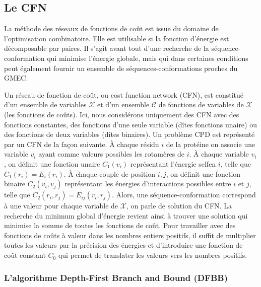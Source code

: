\subsection{Le CFN}

La méthode des réseaux de fonctions de coût est issue du domaine de l'optimisation combinatoire. Elle est utilisable si la fonction d'énergie est décomposable par paires. Il s'agit avant tout d'une recherche de la séquence-conformation qui minimise l'énergie globale, mais qui dans certaines conditions peut également fournir un ensemble de séquences-conformations proches du GMEC.

Un réseau de fonction de coût, ou \og cost function network  \fg (CFN), est constitué d'un ensemble de variables $\mathcal{X}$ et d'un ensemble $\mathcal{C}$ de fonctions de variables de $\mathcal{X}$ (les fonctions de coûts). Ici, nous considérons uniquement des CFN avec des fonctions constantes, des fonctions d'une seule variable (dîtes fonctions unaire) ou des fonctions de deux variables (dîtes binaires). Un problème CPD est représenté par un CFN de la façon suivante. À chaque résidu $i$ de la protéine on associe une variable $v_i$ ayant comme valeurs possibles les rotamères de $i$. À chaque variable $v_i$, on définit une fonction unaire $C_1(v_i)$ représentant l'énergie \og self\fg en $i$, telle que $C_1(r_i)=E_i(r_i)$. À chaque couple de position $i,j$, on définit une fonction binaire $C_2(v_i,v_j)$ représentant les énergies d'interactions possibles entre $i$ et $j$, telle que $C_2(r_i,r_j)=E_{ij}(r_i,r_j)$. Alors, une séquence-conformation correspond à une valeur pour chaque variable de $\mathcal{X}$, on parle de solution du CFN. La recherche du minimum global d'énergie revient ainsi à trouver une solution qui minimise la somme de toutes les fonctions de coût. Pour travailler avec des fonctions de coûts à valeur dans les nombres entiers positifs, il suffit de multiplier toutes les valeurs par la précision des énergies et d'introduire une fonction de coût constant $C_0$ qui permet de translater les valeurs vers les nombres positifs.
%
\subsubsection{L'algorithme \og Depth-First Branch and Bound \fg (DFBB)}

